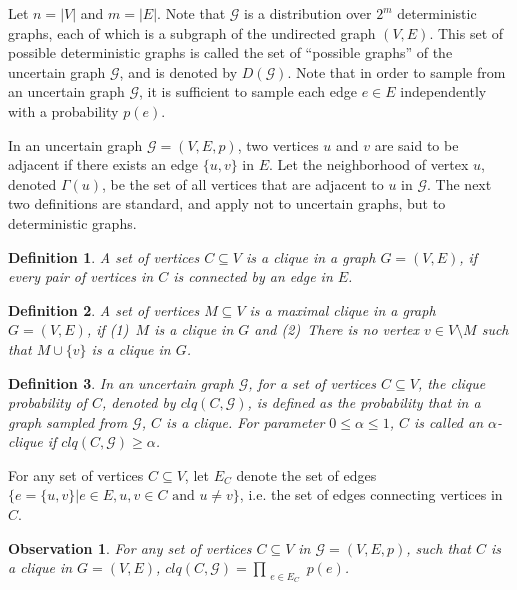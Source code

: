 \documentclass[11pt,letterpaper]{article}
\newtheorem{observation}{Observation}
\newtheorem{definition}{Definition}
\newcommand{\ugraph}{\mathcal{G}}
\newcommand{\cliqueprob}{clq}
\begin{document}
Let $n=|V|$ and $m=|E|$. Note that $\mathcal{G}$ is a
distribution over $2^m$ deterministic graphs, each of which is a
subgraph of the undirected graph $(V,E)$. This set of possible 
deterministic graphs is
called the set of ``possible graphs'' of the uncertain graph
$\ugraph$, and is denoted by $D(\ugraph)$.  Note that in order to
sample from an uncertain graph $\ugraph$, it is sufficient to sample
each edge $e \in E$ independently with a probability $p(e)$.

In an uncertain graph $\ugraph=(V,E,p)$, two vertices $u$ and $v$ are
said to be adjacent if there exists an edge $\{u,v\}$ in $E$. Let the
neighborhood of vertex $u$, denoted $\Gamma(u)$, be the set of all
vertices that are adjacent to $u$ in $\ugraph$. The next two 
definitions are standard, and apply not to uncertain graphs, but to
deterministic graphs.

\begin{definition}
\label{def:CliqueInPossibleGraph} %
A set of vertices $C \subseteq V$ is a clique in a graph $G=(V,E)$, if
every pair of vertices in $C$ is connected by an edge in $E$.
\end{definition}

\begin{definition}
\label{def:MaxCliqueInPossibleGraph} %
A set of vertices $M \subseteq V$ is a maximal clique in a graph $G=(V,E)$, if
(1)~$M$ is a clique in $G$ and 
(2)~There is no vertex $v \in V \setminus M$ such that $M \cup \{v\}$ is a clique in $G$.
\end{definition}

\begin{definition}
In an uncertain graph $\ugraph$, for a set of vertices $C \subseteq V$,
the clique probability of $C$, denoted by $\cliqueprob(C,\ugraph)$, is
defined as the probability that in a graph sampled from $\ugraph$, $C$
is a clique. For parameter $0 \le \alpha \le 1$, $C$ is called an 
$\alpha$-clique if $\cliqueprob(C,\ugraph) \ge \alpha$.
\end{definition}

For any set of vertices $C \subseteq V$, let $E_C$ denote the set of
edges $\{e=\{u,v\} | e \in E, u,v \in C \mbox{ and } u \neq v\}$, i.e.
the set of edges connecting vertices in $C$.

\begin{observation}
\label{obs:Prod}
For any set of vertices $C \subseteq V$ in $\ugraph=(V,E,p)$, 
such that $C$ is a clique in $G=(V,E)$,
$\cliqueprob(C,\ugraph) = \prod_{\substack{e \in E_C}} p(e)$.
\end{observation}
\end{document}
